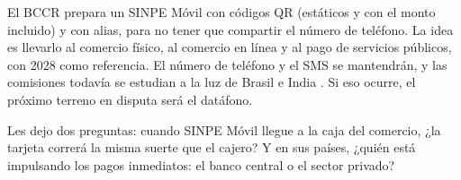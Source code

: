 \documentclass[11pt,letterpaper]{article}
\begin{document}
El BCCR prepara un SINPE Móvil con códigos QR (estáticos y con el monto
incluido) y con alias, para no tener que compartir el número de teléfono. La
idea es llevarlo al comercio físico, al comercio en línea y al pago de servicios
públicos, con 2028 como referencia. El número de teléfono y el SMS se
mantendrán, y las comisiones todavía se estudian a la luz de Brasil e India
\parencite{arias2026}. Si eso ocurre, el próximo terreno en disputa será el
datáfono.

Les dejo dos preguntas: cuando SINPE Móvil llegue a la caja del comercio, ¿la
tarjeta correrá la misma suerte que el cajero? Y en sus países, ¿quién está
impulsando los pagos inmediatos: el banco central o el sector privado?

\printbibliography[title={Referencias}]
\end{document}
